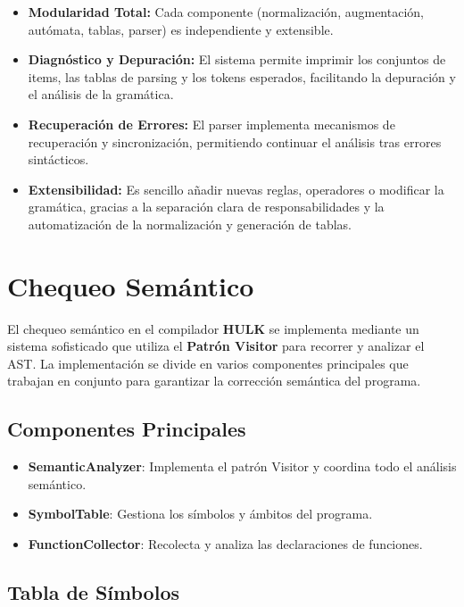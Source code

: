 \documentclass[11pt, a4paper, twoside]{article} %
\begin{document}
\begin{itemize}
    \item \textbf{Modularidad Total:} Cada componente (normalización, augmentación, autómata, tablas, parser) es independiente y extensible.
    \item \textbf{Diagnóstico y Depuración:} El sistema permite imprimir los conjuntos de items, las tablas de parsing y los tokens esperados, facilitando la depuración y el análisis de la gramática.
    \item \textbf{Recuperación de Errores:} El parser implementa mecanismos de recuperación y sincronización, permitiendo continuar el análisis tras errores sintácticos.
    \item \textbf{Extensibilidad:} Es sencillo añadir nuevas reglas, operadores o modificar la gramática, gracias a la separación clara de responsabilidades y la automatización de la normalización y generación de tablas.
\end{itemize}

\section{Chequeo Sem\'antico}
El chequeo sem\'antico en el compilador \textbf{HULK} se implementa mediante un sistema sofisticado que utiliza el \textbf{Patr\'on Visitor} para recorrer y analizar el AST. La implementación se divide en varios componentes principales que trabajan en conjunto para garantizar la corrección semántica del programa.

\subsection{Componentes Principales}

\begin{itemize}
    \item \textbf{SemanticAnalyzer}: Implementa el patrón Visitor y coordina todo el análisis semántico.
    \item \textbf{SymbolTable}: Gestiona los símbolos y ámbitos del programa.
    \item \textbf{FunctionCollector}: Recolecta y analiza las declaraciones de funciones.
\end{itemize}

\subsection{Tabla de S\'imbolos}
\end{document}
